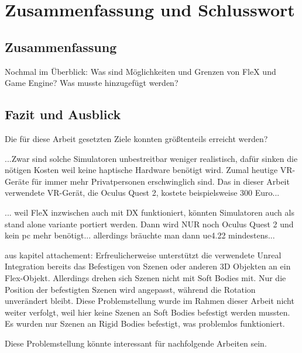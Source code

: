\chapter{Zusammenfassung und Schlusswort}

\section{Zusammenfassung}
Nochmal im Überblick: Was sind Möglichkeiten und Grenzen von FleX und Game Engine? Was musste hinzugefügt werden?

\section{Fazit und Ausblick}
Die für diese Arbeit gesetzten Ziele konnten größtenteils erreicht werden?

...Zwar sind solche Simulatoren unbestreitbar weniger realistisch, dafür sinken die nötigen Kosten weil keine haptische Hardware benötigt wird. Zumal heutige VR-Geräte für immer mehr Privatpersonen erschwinglich sind. Das in dieser Arbeit verwendete VR-Gerät, die Oculus Quest 2, kostete beispielsweise 300 Euro...

... weil FleX inzwischen auch mit DX funktioniert, könnten Simulatoren auch als stand alone variante portiert werden. Dann wird NUR  noch Oculus Quest 2 und kein pc mehr benötigt... allerdings bräuchte man dann ue4.22 mindestens...


aus kapitel attachement:
Erfreulicherweise unterstützt die verwendete Unreal Integration bereits das Befestigen von Szenen oder anderen 3D Objekten an ein Flex-Objekt. Allerdings drehen sich Szenen nicht mit Soft Bodies mit. Nur die Position der befestigten Szenen wird angepasst, während die Rotation unverändert bleibt. 
Diese Problemstellung wurde im Rahmen dieser Arbeit nicht weiter verfolgt, weil hier keine Szenen an Soft Bodies befestigt werden mussten. Es wurden nur Szenen an Rigid Bodies befestigt, was problemlos funktioniert.

Diese Problemstellung könnte interessant für nachfolgende Arbeiten sein.


